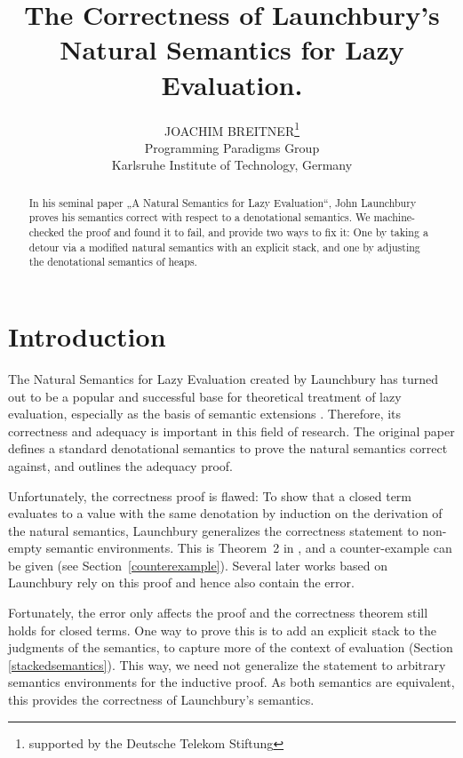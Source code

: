 \documentclass{jfp1}
\title[The Correctness of Launchbury's Semantics]
      {The Correctness of Launchbury's Natural Semantics for Lazy Evaluation.}
\author[J. Breitner]
        {JOACHIM BREITNER\thanks{supported by the Deutsche Telekom Stiftung}\\
	Programming Paradigms Group\\
         Karlsruhe Institute of Technology, Germany\\
         \email{breitner@kit.edu}}
\theoremstyle{nonumberbreak}
\begin{document}
\label{firstpage}

\maketitle

\begin{abstract}
In his seminal paper „A Natural Semantics for Lazy Evaluation“, John Launchbury
proves his semantics correct with respect to a denotational semantics. We
machine-checked the proof and found it to fail, and provide two ways to fix it:
One by taking a detour via a modified natural semantics with an explicit stack,
and one by adjusting the denotational semantics of heaps.
\end{abstract}

\tableofcontents

\section{Introduction}

The Natural Semantics for Lazy Evaluation created by Launchbury  has turned out to be a popular and successful base for theoretical treatment of lazy evaluation, especially as the basis of semantic extensions \cite{nakata, nakata_blackhole, distributed, mixed, parallel}. Therefore, its correctness and adequacy is important in this field of research. The original paper defines a standard denotational semantics to prove the natural semantics correct against, and outlines the adequacy proof.

Unfortunately, the correctness proof is flawed: To show that a closed term evaluates to a value with the same denotation by induction on the derivation of the natural semantics, Launchbury generalizes the correctness statement to non-empty semantic environments. This is Theorem~2 in \cite{launchbury}, and a counter-example can be given (see Section~\ref{counterexample}). Several later works based on Launchbury rely on this proof and hence also contain the error.

Fortunately, the error only affects the proof and the correctness theorem still holds for closed terms. One way to prove this is to add an explicit stack to the judgments of the semantics, to capture more of the context of evaluation (Section \ref{stackedsemantics}). This way, we need not generalize the statement to arbitrary semantics environments for the inductive proof. As both semantics are equivalent, this provides the correctness of Launchbury's semantics.
\end{document}
